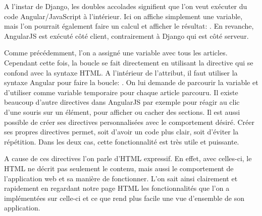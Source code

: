 \documentclass[letterpaper,10pt,oneside]{sphinxmanual}
\begin{document}
A l'instar de Django, les doubles accolades signifient que l'on veut exécuter du code Angular/JavaScript à l'intérieur. Ici on affiche simplement une variable, mais l'on pourrait également faire un calcul et afficher le résultat: . En revanche, AngularJS est exécuté côté client, contrairement à Django qui est côté serveur.

Comme précédemment, l'on a assigné une variable avec tous les articles. Cependant cette fois, la boucle se fait directement en utilisant la directive  qui se confond avec la syntaxe HTML. A l'intérieur de l'attribut, il faut utiliser la syntaxe Angular pour faire la boucle: . On lui demande de parcourir la variable  et d'utiliser comme variable temporaire  pour chaque article parcouru. Il existe beaucoup d'autre directives dans AngularJS par exemple pour réagir au clic d'une souris sur un élément, pour afficher ou cacher des sections. Il est aussi possible de créer ses directives personnalisées avec le comportement désiré. Créer ses propres directives permet, soit d'avoir un code plus clair, soit d'éviter la répétition. Dans les deux cas, cette fonctionnalité est très utile et puissante.

A cause de ces directives l'on parle d'HTML expressif. En effet, avec celles-ci, le HTML ne décrit pas seulement le contenu, mais aussi le comportement de l'application web et sa manière de fonctionner. L'on sait ainsi clairement et rapidement en regardant notre page HTML les fonctionnalités que l'on a implémentées sur celle-ci et ce que rend plus facile une vue d'ensemble de son application.
\end{document}
